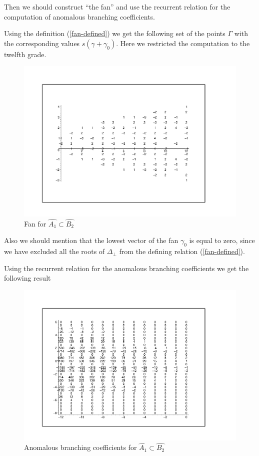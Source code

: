 \documentclass[a4paper,12pt]{article}
\theoremstyle{definition} \newtheorem{Def}{Definition}
\begin{document}
Then we should construct ``the fan'' and use the recurrent relation for the computation of anomalous branching coefficients.

Using the definition (\ref{fan-defined}) we get the following set of
the points $\Gamma$ with the corresponding values $s(\gamma+\gamma_0)$. 
Here we restricted the computation to the twelfth grade.
\begin{figure}[ph]
  \includegraphics[width=150mm]{AffineB2_A1_fan.pdf}
  \caption{Fan for $\hat{A_1}\subset \hat{B_2}$}
  \label{fig:B4B2Fan}
\end{figure}

Also we should mention that the lowest vector of the fan $\gamma_0$ is equal to zero, since we have excluded all the roots of $\Delta_{\bot}$ from the defining relation (\ref{fan-defined}).

Using the recurrent relation for the anomalous branching coefficients we get the following result
\begin{figure}[ph]
  \includegraphics[width=150mm]{AffineB2_A1_branching.pdf}
  \caption{Anomalous branching coefficients for $\hat{A_1}\subset \hat{B_2}$}
  \label{fig:AffineB2_A1_branching}
\end{figure}
\end{document}
